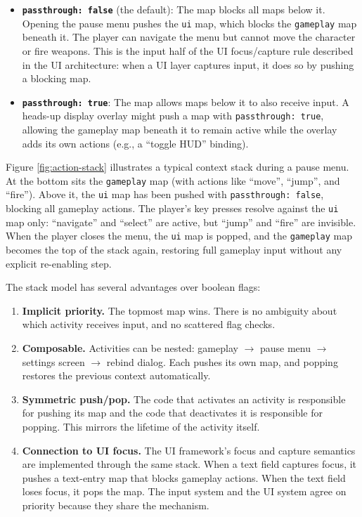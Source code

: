\documentclass[
  11pt,
  letterpaper,
  DIV=11,
  numbers=noendperiod,
  twoside,
  open=right]{scrreprt}
\providecommand{\tightlist}{%
  \setlength{\itemsep}{0pt}\setlength{\parskip}{0pt}}
\begin{document}
\begin{itemize}
\item
  \textbf{\texttt{passthrough:\ false}} (the default): The map blocks
  all maps below it. Opening the pause menu pushes the \texttt{ui} map,
  which blocks the \texttt{gameplay} map beneath it. The player can
  navigate the menu but cannot move the character or fire weapons. This
  is the input half of the UI focus/capture rule described in the UI
  architecture: when a UI layer captures input, it does so by pushing a
  blocking map.
\item
  \textbf{\texttt{passthrough:\ true}}: The map allows maps below it to
  also receive input. A heads-up display overlay might push a map with
  \texttt{passthrough:\ true}, allowing the gameplay map beneath it to
  remain active while the overlay adds its own actions (e.g., a ``toggle
  HUD'' binding).
\end{itemize}

Figure \ref{fig:action-stack} illustrates a typical context stack during
a pause menu. At the bottom sits the \texttt{gameplay} map (with actions
like ``move'', ``jump'', and ``fire''). Above it, the \texttt{ui} map
has been pushed with \texttt{passthrough:\ false}, blocking all gameplay
actions. The player's key presses resolve against the \texttt{ui} map
only: ``navigate'' and ``select'' are active, but ``jump'' and ``fire''
are invisible. When the player closes the menu, the \texttt{ui} map is
popped, and the \texttt{gameplay} map becomes the top of the stack
again, restoring full gameplay input without any explicit re-enabling
step.



The stack model has several advantages over boolean flags:

\begin{enumerate}
\def\labelenumi{\arabic{enumi}.}
\tightlist
\item
  \textbf{Implicit priority.} The topmost map wins. There is no
  ambiguity about which activity receives input, and no scattered flag
  checks.
\item
  \textbf{Composable.} Activities can be nested: gameplay
  \(\rightarrow\) pause menu \(\rightarrow\) settings screen
  \(\rightarrow\) rebind dialog. Each pushes its own map, and popping
  restores the previous context automatically.
\item
  \textbf{Symmetric push/pop.} The code that activates an activity is
  responsible for pushing its map and the code that deactivates it is
  responsible for popping. This mirrors the lifetime of the activity
  itself.
\item
  \textbf{Connection to UI focus.} The UI framework's focus and capture
  semantics are implemented through the same stack. When a text field
  captures focus, it pushes a text-entry map that blocks gameplay
  actions. When the text field loses focus, it pops the map. The input
  system and the UI system agree on priority because they share the
  mechanism.
\end{enumerate}
\end{document}
